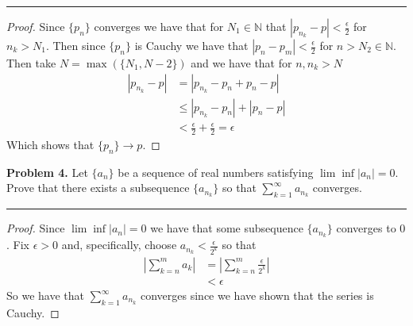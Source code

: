 \documentclass[leqno]{article}
\theoremstyle{nonumberplain}
\newtheorem{proof}{Proof}
\begin{document}
\noindent\rule[0.5ex]{\linewidth}{1pt}

\begin{proof}
Since $\{p_n\}$ converges we have that for $N_1\in \mathbb{N}$ that $|p_{n_k}-p|<\frac{\epsilon}{2}$ for $n_k>N_1$.  Then since $\{p_n\}$ is Cauchy we have that $|p_n-p_m|<\frac{\epsilon}{2}$ for $n>N_2\in \mathbb{N}$.  Then take $N=\max(\{N_1,N-2\})$ and we have that for $n,n_k>N$
\begin{align*}
|p_{n_k}-p|&=|p_{n_k}-p_n+p_n-p|\\
&\leq |p_{n_k}-p_n|+|p_n-p|\\
&<\frac{\epsilon}{2}+\frac{\epsilon}{2}=\epsilon
\end{align*}
Which shows that $\{p_n\}\to p$.
\end{proof}

\pagebreak





\noindent\textbf{Problem 4.} Let $\{a_n\}$ be a sequence of real numbers satisfying $\lim \inf |a_n| =0$. Prove that there exists a subsequence $\{a_{n_k}\}$ so that $\sum_{k=1}^\infty a_{n_k}$ converges.

\noindent\rule[0.5ex]{\linewidth}{1pt}

\begin{proof} 
Since $\lim\inf |a_n|=0$ we have that some subsequence $\{a_{n_k}\}$ converges to $0$.  Fix $\epsilon>0$ and, specifically, choose $a_{n_k}<\frac{\epsilon}{2^k}$ so that
\begin{align*}
\left|\sum_{k=n}^m a_k\right|&=\left|\sum_{k=n}^m \frac{\epsilon}{2^k}\right|\\
&<\epsilon
\end{align*}
So we have that $\sum_{k=1}^\infty a_{n_k}$ converges since we have shown that the series is Cauchy.
\end{proof}

\pagebreak
\end{document}
